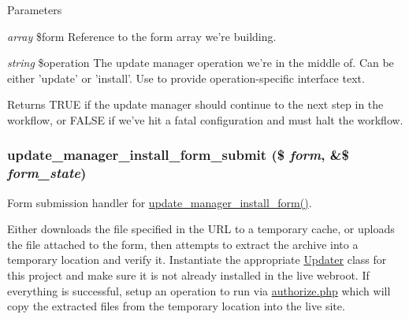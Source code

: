 \begin{DoxyParams}{Parameters}
\item[{\em array}]\$form Reference to the form array we're building. \item[{\em string}]\$operation The update manager operation we're in the middle of. Can be either 'update' or 'install'. Use to provide operation-\/specific interface text.\end{DoxyParams}
\begin{DoxyReturn}{Returns}
TRUE if the update manager should continue to the next step in the workflow, or FALSE if we've hit a fatal configuration and must halt the workflow. 
\end{DoxyReturn}
\hypertarget{group__update__manager__install_ga52e9f2cddddddccf921284b01f9505b0}{
\subsubsection[{update\_\-manager\_\-install\_\-form\_\-submit}]{\setlength{\rightskip}{0pt plus 5cm}update\_\-manager\_\-install\_\-form\_\-submit (\$ {\em form}, \/  \&\$ {\em form\_\-state})}}
\label{group__update__manager__install_ga52e9f2cddddddccf921284b01f9505b0}
Form submission handler for \hyperlink{group__forms_ga5905518e0d54228827271f90dcd8c5c3}{update\_\-manager\_\-install\_\-form()}.

Either downloads the file specified in the URL to a temporary cache, or uploads the file attached to the form, then attempts to extract the archive into a temporary location and verify it. Instantiate the appropriate \hyperlink{classUpdater}{Updater} class for this project and make sure it is not already installed in the live webroot. If everything is successful, setup an operation to run via \hyperlink{authorize_8php}{authorize.php} which will copy the extracted files from the temporary location into the live site.

